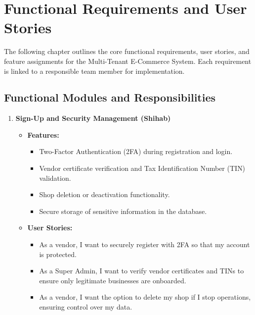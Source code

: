 \chapter{Functional Requirements and User Stories} \label{ch:functional}

The following chapter outlines the core functional requirements, user stories, and feature assignments for the Multi-Tenant E-Commerce System. Each requirement is linked to a responsible team member for implementation.

\section{Functional Modules and Responsibilities}

\begin{enumerate}
    \item \textbf{Sign-Up and Security Management (Shihab)}
    \begin{itemize}
        \item \textbf{Features:} 
        \begin{itemize}
            \item Two-Factor Authentication (2FA) during registration and login.
            \item Vendor certificate verification and Tax Identification Number (TIN) validation.
            \item Shop deletion or deactivation functionality.
            \item Secure storage of sensitive information in the database.
        \end{itemize}
        \item \textbf{User Stories:}
        \begin{itemize}
            \item As a vendor, I want to securely register with 2FA so that my account is protected.
            \item As a Super Admin, I want to verify vendor certificates and TINs to ensure only legitimate businesses are onboarded.
            \item As a vendor, I want the option to delete my shop if I stop operations, ensuring control over my data.
        \end{itemize}
    \end{itemize}


\end{enumerate}
